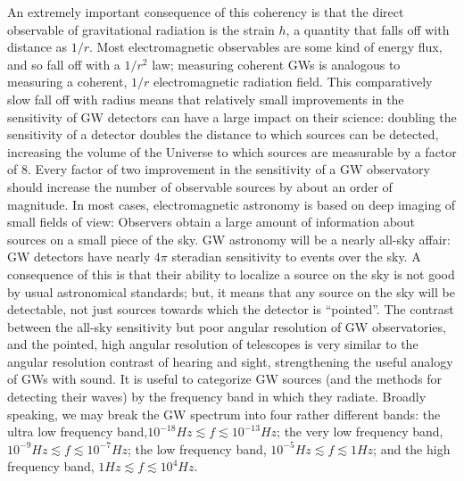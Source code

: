 \documentclass[binding=0.6cm, LaM]{sapthesis}
\begin{document}
An extremely important consequence of this coherency is that the direct observable of gravitational radiation is the strain $h$, a quantity that falls off with distance as $1/r$. 
Most electromagnetic observables are some kind of energy flux, and so fall off with a $1/r^2$ law; measuring coherent GWs is analogous to measuring a coherent, $1/r$ 
electromagnetic radiation field. This comparatively slow fall off with radius means that relatively small improvements in the sensitivity of GW detectors can have a large impact on their science: 
doubling the sensitivity of a detector doubles the distance to which sources can be detected, increasing the volume of the Universe to which sources are measurable by a factor of 8. 
Every factor of two improvement in the sensitivity of a GW observatory should increase the number of observable sources by about an order of magnitude. 
In most cases, electromagnetic astronomy is based on deep imaging of small fields of view: Observers obtain a large amount of information about sources on a small piece of the sky. 
GW astronomy will be a nearly all-sky affair: GW detectors have nearly $4\pi$ steradian sensitivity to events over the sky. A consequence of this is that their ability to localize a source on the sky
 is not good by usual astronomical standards; but, it means that any source on the sky will be detectable, not just sources towards which the detector is “pointed”. 
The contrast between the all-sky sensitivity but poor angular resolution of GW observatories, and the pointed, high angular resolution of telescopes is very similar to the angular resolution contrast
 of hearing and sight, strengthening the useful analogy of GWs with sound. 
It is useful to categorize GW sources (and the methods for detecting their waves) by the frequency band in which they radiate. 
Broadly speaking, we may break the GW spectrum into four rather different bands: the ultra low frequency band,$10^{-18}Hz \apprle f \apprle 10^{-13} Hz$; 
the very low frequency band, $10^{-9} Hz \apprle f \apprle 10^{-7} Hz$; the low frequency band, $10^{-5} Hz \apprle f \apprle 1Hz$; and the high frequency band, $1Hz \apprle f \apprle 10^4 Hz$.
\end{document}

